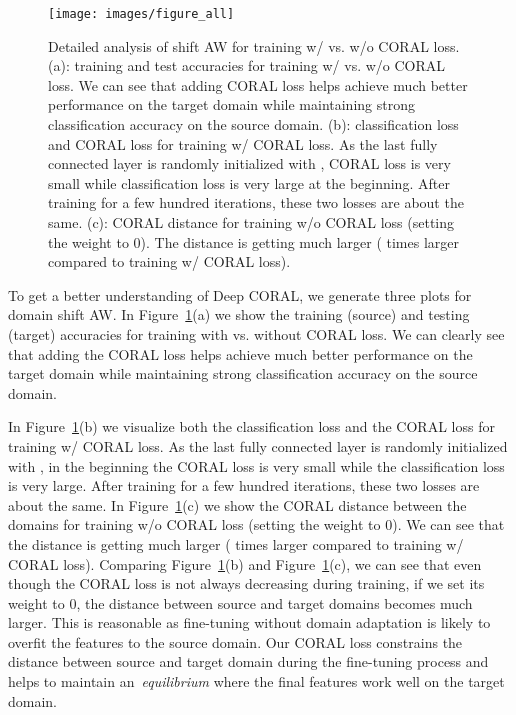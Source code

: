 \begin{figure}
\centering
\texttt{[image: images/figure\_all]}
\caption{Detailed analysis of shift AW for training w/ vs. w/o CORAL loss. (a): training and test accuracies for training w/ vs. w/o CORAL loss. We can see that adding CORAL loss helps achieve much better performance on the target domain while maintaining strong classification accuracy on the source domain. (b): classification loss and CORAL loss for training w/ CORAL loss. As the last fully connected layer is randomly initialized with , CORAL loss is very small while classification loss is very large at the beginning. After training for a few hundred iterations, these two losses are about the same. (c): CORAL distance for training w/o CORAL loss  (setting the weight to 0). The distance is getting much larger ( times larger compared to training w/ CORAL loss).}
\label{fig:a_w}
\end{figure}

To get a better understanding of Deep CORAL, we generate three plots for domain shift AW. In Figure~\ref{fig:a_w}(a) we show the training (source) and testing (target) accuracies for training with vs. without CORAL loss. We can clearly see that adding the CORAL loss helps achieve much better performance on the target domain while maintaining strong classification accuracy on the source domain. 

In Figure~\ref{fig:a_w}(b) we visualize both the classification loss and the CORAL loss for training w/ CORAL loss. As the last fully connected layer is randomly initialized with ,  in the beginning the CORAL loss is very small while the classification loss is very large. After training for a few hundred iterations, these two losses are about the same. In Figure~\ref{fig:a_w}(c) we show the CORAL distance between the domains for training w/o CORAL loss (setting the weight to 0). We can see that the distance is getting much larger ( times larger compared to training w/ CORAL loss). Comparing Figure~\ref{fig:a_w}(b) and Figure~\ref{fig:a_w}(c), we can see that even though the CORAL loss is not always decreasing during training, if we set its weight to 0, the distance between source and target domains becomes much larger. This is reasonable as fine-tuning without domain adaptation is likely to overfit the features to the source domain. Our CORAL loss constrains the distance between source and target domain during the fine-tuning process and helps to maintain an~\emph{equilibrium} where the final features work well on the target domain.
